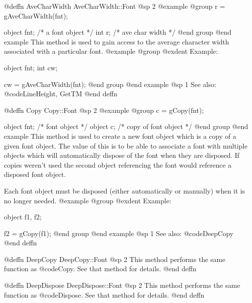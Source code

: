 @deffn {AveCharWidth} AveCharWidth::Font
@sp 2
@example
@group
r = gAveCharWidth(fnt);

object   fnt;  /*  a font object  */
int      r;    /*  ave char width */
@end group
@end example
This method is used to gain access to the average character width
associated with a particular font.  
@example
@group
@exdent Example:

object  fnt;
int     cw;

cw = gAveCharWidth(fnt);
@end group
@end example
@sp 1
See also:  @code{LineHeight, GetTM}
@end deffn










@deffn {Copy} Copy::Font
@sp 2
@example
@group
c = gCopy(fnt);

object  fnt;    /*  font object          */
object  c;      /*  copy of font object  */
@end group
@end example
This method is used to create a new font object which is a copy of a
given font object.  The value of this is to be able to associate a
font with multiple objects which will automatically dispose of the
font when they are disposed.  If copies weren't used the second object
referencing the font would reference a disposed font object.

Each font object must be disposed (either automatically or manually)
when it is no longer needed.
@example
@group
@exdent Example:

object  f1, f2;

f2 = gCopy(f1);
@end group
@end example
@sp 1
See also:  @code{DeepCopy}
@end deffn











@deffn {DeepCopy} DeepCopy::Font
@sp 2
This method performs the same function as @code{Copy}.  See that
method for details.
@end deffn











@deffn {DeepDispose} DeepDispose::Font
@sp 2
This method performs the same function as @code{Dispose}.  See that
method for details.
@end deffn








